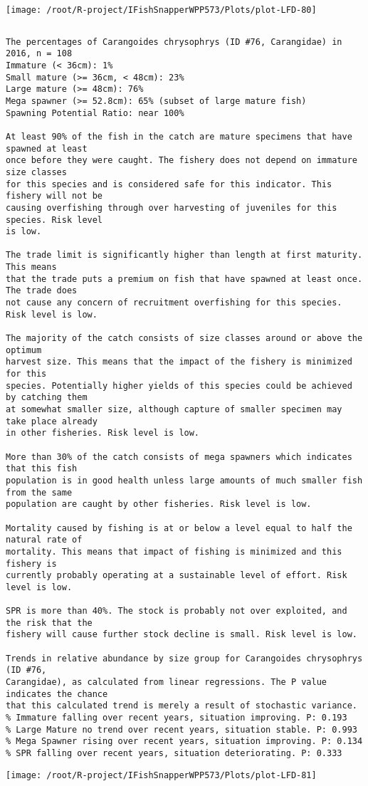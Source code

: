 \documentclass{report}\usepackage[]{graphicx}\usepackage[]{color}
\makeatletter
\def\maxwidth{ %
  \ifdim\Gin@nat@width>\linewidth
    \linewidth
  \else
    \Gin@nat@width
  \fi
}
\newenvironment{kframe}{%
 \def\at@end@of@kframe{}%
 \ifinner\ifhmode%
  \def\at@end@of@kframe{\end{minipage}}%
  \begin{minipage}{\columnwidth}%
 \fi\fi%
 \def\FrameCommand##1{\hskip\@totalleftmargin \hskip-\fboxsep
 \colorbox{shadecolor}{##1}\hskip-\fboxsep
     \hskip-\linewidth \hskip-\@totalleftmargin \hskip\columnwidth}%
 \MakeFramed {\advance\hsize-\width
   \@totalleftmargin\z@ \linewidth\hsize
   \@setminipage}}%
 {\par\unskip\endMakeFramed%
 \at@end@of@kframe}
\newenvironment{knitrout}{}{} %
\makeatother
\begin{document}
\begin{knitrout}
\texttt{[image: /root/R-project/IFishSnapperWPP573/Plots/plot-LFD-80]} 
\begin{kframe}\begin{verbatim}
\end{verbatim}
\end{kframe}
\clearpage
\newpage
\begin{kframe}\begin{verbatim}The percentages of Carangoides chrysophrys (ID #76, Carangidae) in 2016, n = 108
Immature (< 36cm): 1%
Small mature (>= 36cm, < 48cm): 23%
Large mature (>= 48cm): 76%
Mega spawner (>= 52.8cm): 65% (subset of large mature fish)
Spawning Potential Ratio: near 100%
 
At least 90% of the fish in the catch are mature specimens that have spawned at least
once before they were caught. The fishery does not depend on immature size classes
for this species and is considered safe for this indicator. This fishery will not be
causing overfishing through over harvesting of juveniles for this species. Risk level
is low.

The trade limit is significantly higher than length at first maturity.  This means
that the trade puts a premium on fish that have spawned at least once. The trade does
not cause any concern of recruitment overfishing for this species. Risk level is low.

The majority of the catch consists of size classes around or above the optimum
harvest size. This means that the impact of the fishery is minimized for this
species. Potentially higher yields of this species could be achieved by catching them
at somewhat smaller size, although capture of smaller specimen may take place already
in other fisheries. Risk level is low.

More than 30% of the catch consists of mega spawners which indicates that this fish
population is in good health unless large amounts of much smaller fish from the same
population are caught by other fisheries. Risk level is low.
 
Mortality caused by fishing is at or below a level equal to half the natural rate of
mortality. This means that impact of fishing is minimized and this fishery is
currently probably operating at a sustainable level of effort. Risk level is low.
 
SPR is more than 40%. The stock is probably not over exploited, and the risk that the
fishery will cause further stock decline is small. Risk level is low.
 
Trends in relative abundance by size group for Carangoides chrysophrys (ID #76,
Carangidae), as calculated from linear regressions. The P value indicates the chance
that this calculated trend is merely a result of stochastic variance.
% Immature falling over recent years, situation improving. P: 0.193
% Large Mature no trend over recent years, situation stable. P: 0.993
% Mega Spawner rising over recent years, situation improving. P: 0.134
% SPR falling over recent years, situation deteriorating. P: 0.333
\end{verbatim}
\end{kframe}
\texttt{[image: /root/R-project/IFishSnapperWPP573/Plots/plot-LFD-81]} 


\end{knitrout}
\end{document}

